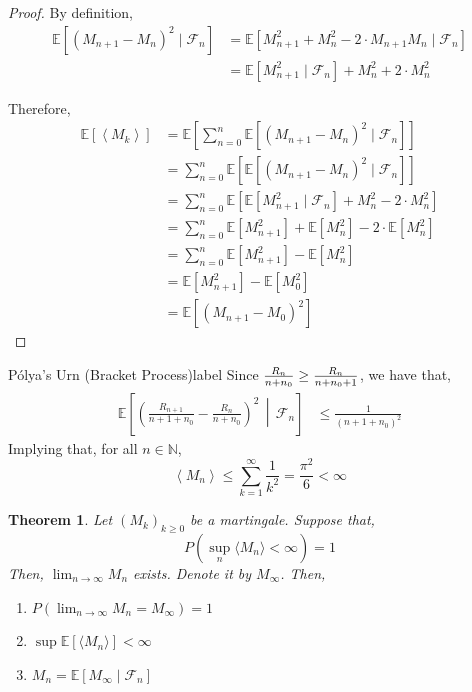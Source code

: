 \documentclass{tufte-handout}
\newtheorem{thm}{Theorem}
\begin{document}
\begin{proof}
  By definition,
  \begin{align*}
    \mathbb{E}\left[\left(M_{n+1}-M_{n}\right)^{2} \mid \mathcal{F}_{n}\right]
    &= \mathbb{E}\left[M_{n+1}^{2}+M_{n}^{2}-2 \cdot M_{n+1} M_{n} \mid \mathcal{F}_{n}\right] \\
    &= \mathbb{E}\left[M_{n+1}^{2} \mid \mathcal{F}_n\right]+M_n^2 + 2 \cdot M_n^2
  \end{align*}

  \noindent Therefore,
    \begin{align*}
    \mathbb{E}\left[\left\langle M_{k}\right\rangle\right]
    &=\mathbb{E}\left[\sum_{n=0}^{n} \mathbb{E}\left[\left(M_{n+1}-M_{n}\right)^{2} \mid \mathcal{F}_{n}\right]\right] \\
    &= \sum_{n=0}^{n} \mathbb{E}\left[\mathbb{E}\left[\left(M_{n+1}-M_{n}\right)^{2} \mid \mathcal{F}_{n}\right]\right] \\
    &= \sum_{n=0}^{n} \mathbb{E}\left[\mathbb{E}\left[M_{n+1}^{2} \mid \mathcal{F}_n\right]+M_n^2 - 2 \cdot M_n^2\right] \\
    &= \sum_{n=0}^{n} \mathbb{E}[M_{n+1}^{2}]+\mathbb{E}[M_n^2] - 2 \cdot \mathbb{E}[M_n^2] \\
    &= \sum_{n=0}^{n} \mathbb{E}[M_{n+1}^{2}]- \mathbb{E}[M_n^2] \\
    &= \mathbb{E}[M_{n+1}^{2}]- \mathbb{E}[M^2_0] \\
    &= \mathbb{E}[\left(M_{n+1} - M_0\right)^2]
  \end{align*}
\end{proof}

\begin{ex}{P\'{o}lya's Urn (Bracket Process)}{label}
  Since $\frac{R_{n}}{n+n_{0}\vphantom{\frac{1}{2}}} \geq \frac{R_{n}}{n+n_{0}+1 \vphantom{\frac{1}{2}}}$, we have that,
  \begin{align*}
    \mathbb{E}\left[\left(\frac{R_{n+1}}{n+1+n_{0}}-\frac{R_{n}}{n+n_{0}}\right)^{2} \,\middle\vert\, \mathcal{F}_{n}\right] &\leq \frac{1}{(n+1+n_0)^2}
  \end{align*}
  \noindent Implying that, for all $n \in \mathbb{N}$,
  \[\left\langle M_{n}\right\rangle \leq \sum_{k=1}^{\infty} \frac{1}{k^{2}}=\frac{\pi^{2}}{6}<\infty\]
\end{ex}

\begin{thm}
  Let $(M_k)_{k \geq 0}$ be a martingale. Suppose that,
  \[P\left(\sup_n \langle M_n \rangle < \infty\right) = 1\]
  \noindent Then, $\lim _{n \rightarrow \infty} M_{n}$ exists. Denote it by $M_{\infty}$. Then,
  \begin{enumerate}
    \item $P\left(\lim _{n \rightarrow \infty} M_{n}=M_{\infty}\right)=1$
    \item $\sup \mathbb{E}[\langle M_n \rangle] < \infty$
    \item $M_n = \mathbb{E}[M_{\infty} \mid \mathcal{F}_n]$
  \end{enumerate}
\end{thm}
\end{document}
